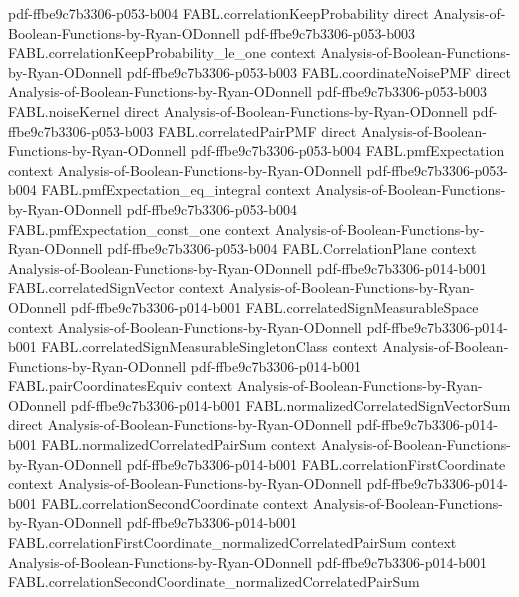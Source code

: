 \begin{theorem}
  {pdf-ffbe9c7b3306-p053-b004}
\proofstep
  {FABL.correlationKeepProbability}
  {direct}
  {Analysis-of-Boolean-Functions-by-Ryan-ODonnell}
  {pdf-ffbe9c7b3306-p053-b003}
\proofstep
  {FABL.correlationKeepProbability_le_one}
  {context}
  {Analysis-of-Boolean-Functions-by-Ryan-ODonnell}
  {pdf-ffbe9c7b3306-p053-b003}
\proofstep
  {FABL.coordinateNoisePMF}
  {direct}
  {Analysis-of-Boolean-Functions-by-Ryan-ODonnell}
  {pdf-ffbe9c7b3306-p053-b003}
\proofstep
  {FABL.noiseKernel}
  {direct}
  {Analysis-of-Boolean-Functions-by-Ryan-ODonnell}
  {pdf-ffbe9c7b3306-p053-b003}
\proofstep
  {FABL.correlatedPairPMF}
  {direct}
  {Analysis-of-Boolean-Functions-by-Ryan-ODonnell}
  {pdf-ffbe9c7b3306-p053-b004}
\proofstep
  {FABL.pmfExpectation}
  {context}
  {Analysis-of-Boolean-Functions-by-Ryan-ODonnell}
  {pdf-ffbe9c7b3306-p053-b004}
\proofstep
  {FABL.pmfExpectation_eq_integral}
  {context}
  {Analysis-of-Boolean-Functions-by-Ryan-ODonnell}
  {pdf-ffbe9c7b3306-p053-b004}
\proofstep
  {FABL.pmfExpectation_const_one}
  {context}
  {Analysis-of-Boolean-Functions-by-Ryan-ODonnell}
  {pdf-ffbe9c7b3306-p053-b004}
\proofstep
  {FABL.CorrelationPlane}
  {context}
  {Analysis-of-Boolean-Functions-by-Ryan-ODonnell}
  {pdf-ffbe9c7b3306-p014-b001}
\proofstep
  {FABL.correlatedSignVector}
  {context}
  {Analysis-of-Boolean-Functions-by-Ryan-ODonnell}
  {pdf-ffbe9c7b3306-p014-b001}
\proofstep
  {FABL.correlatedSignMeasurableSpace}
  {context}
  {Analysis-of-Boolean-Functions-by-Ryan-ODonnell}
  {pdf-ffbe9c7b3306-p014-b001}
\proofstep
  {FABL.correlatedSignMeasurableSingletonClass}
  {context}
  {Analysis-of-Boolean-Functions-by-Ryan-ODonnell}
  {pdf-ffbe9c7b3306-p014-b001}
\proofstep
  {FABL.pairCoordinatesEquiv}
  {context}
  {Analysis-of-Boolean-Functions-by-Ryan-ODonnell}
  {pdf-ffbe9c7b3306-p014-b001}
\proofstep
  {FABL.normalizedCorrelatedSignVectorSum}
  {direct}
  {Analysis-of-Boolean-Functions-by-Ryan-ODonnell}
  {pdf-ffbe9c7b3306-p014-b001}
\proofstep
  {FABL.normalizedCorrelatedPairSum}
  {context}
  {Analysis-of-Boolean-Functions-by-Ryan-ODonnell}
  {pdf-ffbe9c7b3306-p014-b001}
\proofstep
  {FABL.correlationFirstCoordinate}
  {context}
  {Analysis-of-Boolean-Functions-by-Ryan-ODonnell}
  {pdf-ffbe9c7b3306-p014-b001}
\proofstep
  {FABL.correlationSecondCoordinate}
  {context}
  {Analysis-of-Boolean-Functions-by-Ryan-ODonnell}
  {pdf-ffbe9c7b3306-p014-b001}
\proofstep
  {FABL.correlationFirstCoordinate_normalizedCorrelatedPairSum}
  {context}
  {Analysis-of-Boolean-Functions-by-Ryan-ODonnell}
  {pdf-ffbe9c7b3306-p014-b001}
\proofstep
  {FABL.correlationSecondCoordinate_normalizedCorrelatedPairSum}

\end{theorem}
